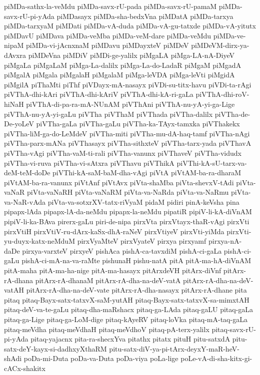 {piMDa-sathx-la-veMdu
piMDa-savx-rU-pada
piMDa-savx-rU-pamaM
piMDa-savx-rU-pi-yAda
piMDasayx
piMDa-sha-bedxVna
piMDatA
piMDa-tarxya
piMDa-tarxyaM
piMDati
piMDa-vA-duda
piMDa-vA-gu-tatxde
piMDa-vA-yitutx
piMDavU
piMDava
piMDa-veMba
piMDa-veM-dare
piMDa-veMdu
piMDa-ve-nipaM
piMDa-vi-jAcnxnaM
piMDavu
piMDayxteV
piMDeV
piMDeVM-dirx-ya-dAvxra
piMDeVna
piMDiV
piMDi-ge-yalilx
piMgaLA
piMga-LA-nA-DiyeV
piMgaLa
piMgaLaM
piMga-La-dalilx
piMga-La-do-LadaR
piMgaM
piMgadA
piMgalA
piMgala
piMgalaH
piMgalaM
piMga-leVDA
piMga-leVti
piMgidA
piMgilA
piThaMti
piThf
piVDayx-mA-nasayx
piVDi-su-titx-havu
piVDi-ta-rAgi
piVThA-dhi-kAri
piVThA-dhi-kAriV
piVThA-dhi-kA-ri-gaLa
piVThA-dhi-roV-hiNaH
piVThA-di-pa-ra-mA-NUnAM
piVThAni
piVThA-nu-yA-yi-ga-Lige
piVThA-nu-yA-yi-gaLu
piVTha
piVThaM
piVThada
piVTha-dalilx
piVTha-de-De-yoLeV
piVTha-gaLa
piVTha-gaLu
piVTha-ka-TAyx-tamxka
piVThakekx
piVTha-liM-ga-do-LeMdeV
piVTha-miti
piVTha-mu-dA-haq-tamf
piVTha-nAgi
piVTha-parx-mANa
piVThasayx
piVTha-sithxteV
piVTha-tarx-yada
piVThavA
piVTha-vAgi
piVTha-vaM-ti-rali
piVTha-vanunx
piVThaveV
piVTha-vidudx
piVTha-vi-ruva
piVTha-vi-sAtxra
piVThavu
piVThikA
piVThi-kA-sU-tarx-va-deM-teM-doDe
piVThi-kA-saM-baM-dha-vAgi
piVtA
piVtAM-ba-ra-dharaM
piVtAM-ba-ra-vanunx
piVtAnf
piVtAvx
piVta-shaMba
piVta-shevxV-tAdi
piVta-vaNaR
piVta-vaNaRH
piVta-vaNaRM
piVta-va-NaRda
piVta-va-NaRmu
piVta-va-NaR-vAda
piVta-va-sotxrXV-tatx-riVyaM
pidaM
pidiri
pinA-keVsha
pina
pipapx-lAda
pipapx-lA-da-neMdu
pipapx-la-neMdu
pipatiR
pipiV-li-kA-diVnAM
pipiV-li-ka-BAva
pirerx-gaLu
piri-de-nipa
pirxVta
pirxVtayx-thaR-vAgi
pirxVti
pirxVtiH
pirxVtiV-ru-dArx-kaSx-dhA-raNeV
pirxVtiyeV
pirxVti-yiMda
pirxVti-yu-duyx-katx-neMduM
pirxVyaMteV
pirxVyateV
pirxya
pirxyamf
pirxya-nA-daDe
pirxya-varxteV
pirxyeV
pishAca
pishA-ca-tavxdiM
pishA-ci-gaLa
pishA-ci-gaLu
pishA-ci-mA-na-va-raMte
pishunaH
pishu-natA
pitA
pitA-ma-hA-diVnAM
pitA-maha
pitA-ma-ha-nige
pitA-ma-hasayx
pitArxdeVH
pitArx-diVnf
pitArx-rA-dhana
pitArx-rA-dhanaM
pitArx-rA-dha-na-deV-vatA
pitArx-rA-dha-na-deV-vatAH
pitArx-rA-dha-na-deV-vate
pitArx-rA-dha-nasayx
pitArx-rA-dhane
pita
pitaq
pitaq-Bayx-satx-tatxvX-saM-yutAH
pitaq-Bayx-satx-tatxvX-sa-mimxtAH
pitaq-deV-va-te-gaLu
pitaq-dha-maRshacx
pitaq-ga-LAda
pitaq-gaLU
pitaq-gaLa
pitaq-ga-Lige
pitaq-ga-LoM-dige
pitaq-kAyeRV
pitaq-loVka
pitaq-mA-taq-gaLa
pitaq-meVdha
pitaq-meVdhaH
pitaq-meVdhoV
pitaq-pA-terx-yalilx
pitaq-savx-rU-pi-yAda
pitaq-yajacnx
pita-ra-shecxYva
pitathx
pitatx
pituH
pitu-satxdA
pitu-satx-deY-kayx-si-dadhxyXthaRM
pitu-satx-diV-ya-pi-tArx-deyxY-maR-heV-shAdi
poDa-mi-Duta
poDa-va-Duta
poDa-viya
poLa-lige
poLe-vA-di-sha-kitx-gi-cACx-shakitx
}

